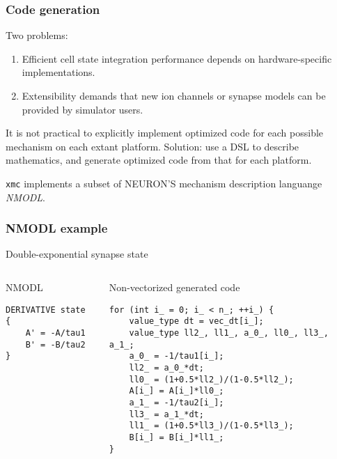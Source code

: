 \documentclass[aspectratio=43,12pt]{beamer}
\newcommand{\xmc}{\texttt{xmc}\xspace}
\begin{document}
\begin{frame}
\frametitle{Code generation}

Two problems:
\begin{enumerate}
\item Efficient cell state integration performance depends on
hardware-specific implementations.
\item Extensibility demands that new ion channels or synapse
models can be provided by simulator users.
\end{enumerate}
\vfill
It is not practical to explicitly implement optimized code for
each possible mechanism on each extant platform.
\vfill
\pause
Solution: use a DSL to describe mathematics, and generate
optimized code from that for each platform.

\vfill
\pause
\xmc{} implements a subset of NEURON'S mechanism description languange \emph{NMODL}.
\end{frame}

\begin{frame}[fragile]
\frametitle{NMODL example}

\centering
Double-exponential synapse state
\vfill

\begin{columns}[T]
\begin{column}{0.5\textwidth}
\centering
    {\small NMODL}
\begin{lstlisting}[frame=single,language={}]
DERIVATIVE state {
    A' = -A/tau1
    B' = -B/tau2
}
\end{lstlisting}
\end{column}

\begin{column}{0.5\textwidth}
\centering
    {\small Non-vectorized generated code}
\begin{lstlisting}[frame=single]
for (int i_ = 0; i_ < n_; ++i_) {
    value_type dt = vec_dt[i_];
    value_type ll2_, ll1_, a_0_, ll0_, ll3_, a_1_;
    a_0_ = -1/tau1[i_];
    ll2_ = a_0_*dt;
    ll0_ = (1+0.5*ll2_)/(1-0.5*ll2_);
    A[i_] = A[i_]*ll0_;
    a_1_ = -1/tau2[i_];
    ll3_ = a_1_*dt;
    ll1_ = (1+0.5*ll3_)/(1-0.5*ll3_);
    B[i_] = B[i_]*ll1_;
}
\end{lstlisting}
\end{column}
\end{columns}
\end{frame}
\end{document}
